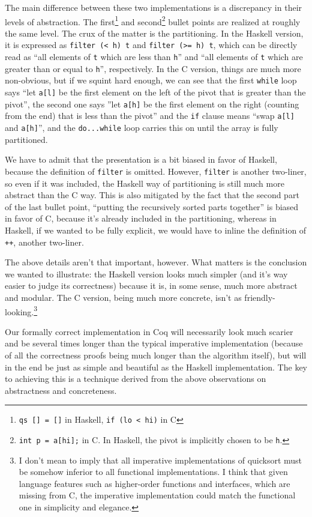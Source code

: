 \documentclass[declaration,mgr,english,shortabstract]{iithesis}
\newcommand{\m}[1]{\texttt{#1}}
\begin{document}
The main difference between these two implementations is a discrepancy in their levels of abstraction. The first\footnote{\m{qs\ []\ =\ []} in Haskell, \m{if\ (lo\ <\ hi)} in C} and second\footnote{\m{int\ p\ =\ a[hi];} in C. In Haskell, the pivot is implicitly chosen to be \m{h}.} bullet points are realized at roughly the same level. The crux of the matter is the partitioning. In the Haskell version, it is expressed as \m{filter (< h) t} and \m{filter (>= h) t}, which can be directly read as ``all elements of \m{t} which are less than \m{h}'' and ``all elements of \m{t} which are greater than or equal to \m{h}'', respectively. In the C version, things are much more non-obvious, but if we squint hard enough, we can see that the first \m{while} loop says ``let \m{a[l]} be the first element on the left of the pivot that is greater than the pivot'', the second one says ''let \m{a[h]} be the first element on the right (counting from the end) that is less than the pivot'' and the \m{if} clause means ``swap \m{a[l]} and \m{a[h]}'', and the \m{do...while} loop carries this on until the array is fully partitioned.

We have to admit that the presentation is a bit biased in favor of Haskell, because the definition of \m{filter} is omitted. However, \m{filter} is another two-liner, so even if it was included, the Haskell way of partitioning is still much more abstract than the C way. This is also mitigated by the fact that the second part of the last bullet point, ``putting the recursively sorted parts together'' is biased in favor of C, because it's already included in the partitioning, whereas in Haskell, if we wanted to be fully explicit, we would have to inline the definition of \m{++}, another two-liner.

The above details aren't that important, however. What matters is the conclusion we wanted to illustrate: the Haskell version looks much simpler (and it's way easier to judge its correctness) because it is, in some sense, much more abstract and modular. The C version, being much more concrete, isn't as friendly-looking.\footnote{I don't mean to imply that all imperative implementations of quicksort must be somehow inferior to all functional implementations. I think that given language features such as higher-order functions and interfaces, which are missing from C, the imperative implementation could match the functional one in simplicity and elegance.}

Our formally correct implementation in Coq will necessarily look much scarier and be several times longer than the typical imperative implementation (because of all the correctness proofs being much longer than the algorithm itself), but will in the end be just as simple and beautiful as the Haskell implementation. The key to achieving this is a technique derived from the above observations on abstractness and concreteness.
\end{document}
